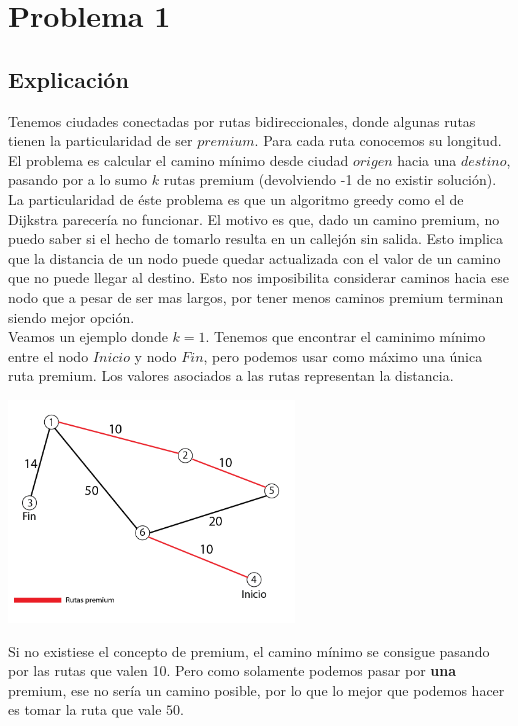 
\section{Problema 1}

\subsection{Explicación}

Tenemos ciudades conectadas por rutas bidireccionales, donde algunas rutas tienen la particularidad de ser $premium$. Para cada ruta conocemos su longitud. El problema es calcular el camino mínimo desde ciudad $origen$ hacia una $destino$, pasando por a lo sumo $k$ rutas premium (devolviendo -1 de no existir solución). \\

La particularidad de éste problema es que un algoritmo greedy como el de Dijkstra parecería no funcionar. El motivo es que, dado un camino premium, no puedo saber si el hecho de tomarlo resulta en un callejón sin salida. Esto implica que la distancia de un nodo puede quedar actualizada con el valor de un camino que no puede llegar al destino. Esto nos imposibilita considerar caminos hacia ese nodo que a pesar de ser mas largos, por tener menos caminos premium terminan siendo mejor opción. \\

Veamos un ejemplo donde $k = 1$. Tenemos que encontrar el caminimo mínimo entre el nodo $Inicio$ y nodo $Fin$, pero podemos usar como máximo una única ruta premium. Los valores asociados a las rutas representan la distancia.

{\centering
	\includegraphics[width=0.57\textwidth]{imagenes/problema1/problema1-c2.png} \\
}

Si no existiese el concepto de premium, el camino mínimo se consigue pasando por las rutas que valen 10. Pero como solamente podemos pasar por \textbf{una} premium, ese no sería un camino posible, por lo que lo mejor que podemos hacer es tomar la ruta que vale $50$.

